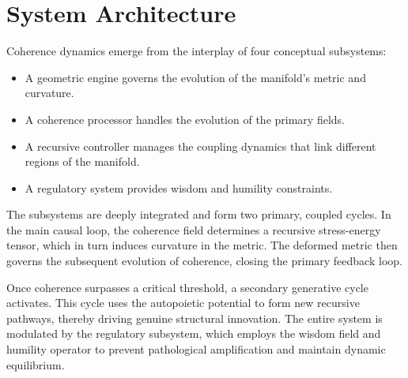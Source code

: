 



\section{System Architecture}
\label{2.3:system_architecture}

Coherence dynamics emerge from the interplay of four conceptual subsystems:

\begin{itemize}

    \item A geometric engine governs the evolution of the manifold's metric and curvature.

    \item A coherence processor handles the evolution of the primary fields.

    \item A recursive controller manages the coupling dynamics that link different regions of the manifold.

    \item A regulatory system provides wisdom and humility constraints.

\end{itemize}

The subsystems are deeply integrated and form two primary, coupled cycles. In the main causal loop, the coherence field determines a recursive stress-energy tensor, which in turn induces curvature in the metric. The deformed metric then governs the subsequent evolution of coherence, closing the primary feedback loop. 

Once coherence surpasses a critical threshold, a secondary generative cycle activates. This cycle uses the autopoietic potential to form new recursive pathways, thereby driving genuine structural innovation. The entire system is modulated by the regulatory subsystem, which employs the wisdom field and humility operator to prevent pathological amplification and maintain dynamic equilibrium.

